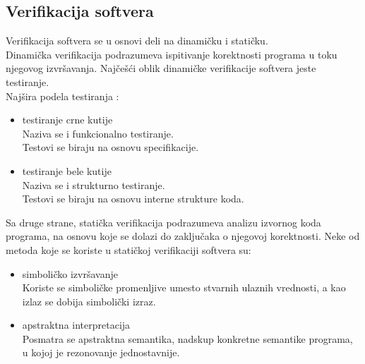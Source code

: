 \documentclass[a4paper]{article}
\begin{document}
\subsection{Verifikacija softvera}
\label{subsec:verifikacija}
Verifikacija softvera se u osnovi deli na dinamičku i statičku.\\
Dinamička verifikacija podrazumeva ispitivanje korektnosti programa u toku njegovog izvršavanja.
Najčešći oblik dinamičke verifikacije softvera jeste testiranje.\\
Najšira podela testiranja \cite{laski2009software}:
\begin{itemize}
\item testiranje crne kutije\\
Naziva se i funkcionalno testiranje.\\
Testovi se biraju na osnovu specifikacije.
\item testiranje bele kutije\\
Naziva se i strukturno testiranje.\\
Testovi se biraju na osnovu interne strukture koda.
\end{itemize}

Sa druge strane, statička verifikacija podrazumeva analizu izvornog koda programa, na osnovu koje se dolazi do zaključaka o njegovoj korektnosti.
Neke od metoda koje se koriste u statičkoj verifikaciji softvera su:
\begin{itemize}
\item simboličko izvršavanje \cite{symbolic_execution}\\
Koriste se simboličke promenljive umesto stvarnih ulaznih vrednosti, a kao izlaz se dobija simbolički izraz.
\item apstraktna interpretacija \cite{abstract_interpretation}\\
Posmatra se apstraktna semantika, nadskup konkretne semantike programa, u kojoj je rezonovanje jednostavnije.

\end{itemize}
\end{document}

